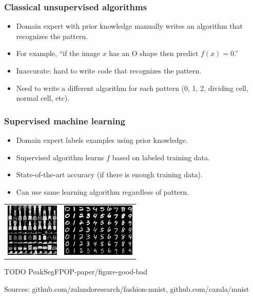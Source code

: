 \documentclass{beamer}
\begin{document}
\begin{frame}
  \frametitle{Classical unsupervised algorithms}
  \begin{itemize}
  \item Domain expert with prior knowledge manually writes an
    algorithm that recognizes the pattern.
  \item For example, ``if the image $x$ has an O shape then predict $f(x)=0$.''
  \item Inaccurate: hard to write code that recognizes the pattern.
  \item Need to write a different algorithm for each pattern (0, 1, 2,
    dividing cell, 
    normal cell,
    etc).
  \end{itemize}
\end{frame}

\begin{frame}
  \frametitle{Supervised machine learning }

  \begin{itemize}
  \item Domain expert labels examples using prior knowledge.
  \item Supervised algorithm learns $f$ based on labeled training data.
  \item State-of-the-art accuracy (if there is enough training data).
  \item Can use same learning algorithm regardless of pattern.
  \end{itemize}

  \begin{tabular}{cc}
  \includegraphics[height=1in]{fashion-mnist-sprite-some}  &
  \includegraphics[height=1in]{mnist-digits}
  \end{tabular}

  TODO PeakSegFPOP-paper/figure-good-bad

  \scriptsize Sources: github.com/zalandoresearch/fashion-mnist, github.com/cazala/mnist
\end{frame}
\end{document}
